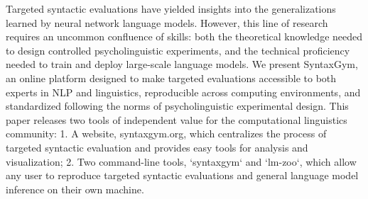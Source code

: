 Targeted syntactic evaluations have yielded insights into the generalizations learned by neural network language models. However, this line of research requires an uncommon confluence of skills: both the theoretical knowledge needed to design controlled psycholinguistic experiments, and the technical proficiency needed to train and deploy large-scale language models. We present SyntaxGym, an online platform designed to make targeted evaluations accessible to both experts in NLP and linguistics, reproducible across computing environments, and standardized following the norms of psycholinguistic experimental design. This paper releases two tools of independent value for the computational linguistics community: 1. A website, syntaxgym.org, which centralizes the process of targeted syntactic evaluation and provides easy tools for analysis and visualization; 2. Two command-line tools, `syntaxgym` and `lm-zoo`, which allow any user to reproduce targeted syntactic evaluations and general language model inference on their own machine.

